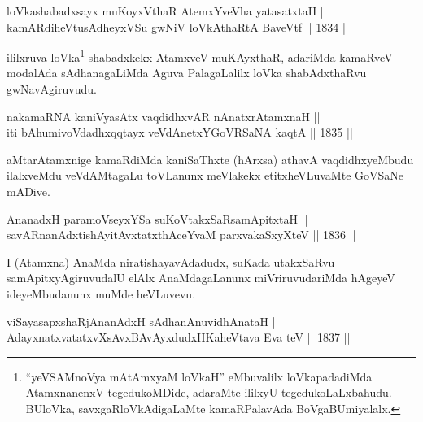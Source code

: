 
\begin{shl}
loVkashabadxsayx muKoyxV\s thaR AtemxYveVha yatasatxtaH || \\
kamARdiheVtusAdheyxVSu gwNiV loVkAthaRtA BaveVtf \hfill || 1834 ||  
\end{shl}

\begin{artha}
ililxruva loVka\footnote{``yeVSAMnoV\s ya mAtAmxyaM loVkaH'' eMbuvalilx loVkapadadiMda
AtamxnanenxV tegedukoMDide, adaraMte ililxyU tegedukoLaLxbahudu. BUloVka, savxgaRloVkAdigaLaMte kamaRPalavAda BoVgaBUmiyalalx.} shabadxkekx AtamxveV muKAyxthaR, adariMda kamaRveV modalAda sAdhanagaLiMda Aguva PalagaLalilx loVka shabAdxthaRvu gwNavAgiruvudu.
\end{artha}


\begin{shl}
na\footnotemark[2] kamaRNA kaniVyasAtx vaqdidhxvAR nAnatxrAtamxnaH ||  \\
iti bAhumivoVdadhxqqtayx veVdAnetxYGoVRSaNA kaqtA \hfill || 1835 ||  
\end{shl}

\begin{artha}
aMtarAtamxnige kamaRdiMda kaniSaThxte (hArxsa) athavA vaqdidhxyeMbudu
ilalxveMdu veVdAMtagaLu toVLanunx meVlakekx etitxheVLuvaMte GoVSaNe
mADive.
\end{artha}


\begin{shl}
AnanadxH paramoV\s seyxYSa suKoVtakxSaRsamApitxtaH || \\
savARnanAdxtishAyitAvxtatxthAceYvaM parxvakaSxyXteV \hfill || 1836 ||  
\end{shl}

\begin{artha}
I (Atamxna) AnaMda niratishayavAdadudx, suKada utakxSaRvu
samApitxyAgiruvudalU elAlx AnaMdagaLanunx miVriruvudariMda hAgeyeV
ideyeMbudanunx muMde heVLuvevu.
\end{artha}

\begin{shl}
\footnotemark[1]viSayasapxshaRjAnanAdxH sAdhanAnuvidhAnataH || \\
AdayxnatxvatatxvXsAvxBAvAyxdudxHKaheVtava Eva teV \hfill || 1837 ||  
\end{shl}

